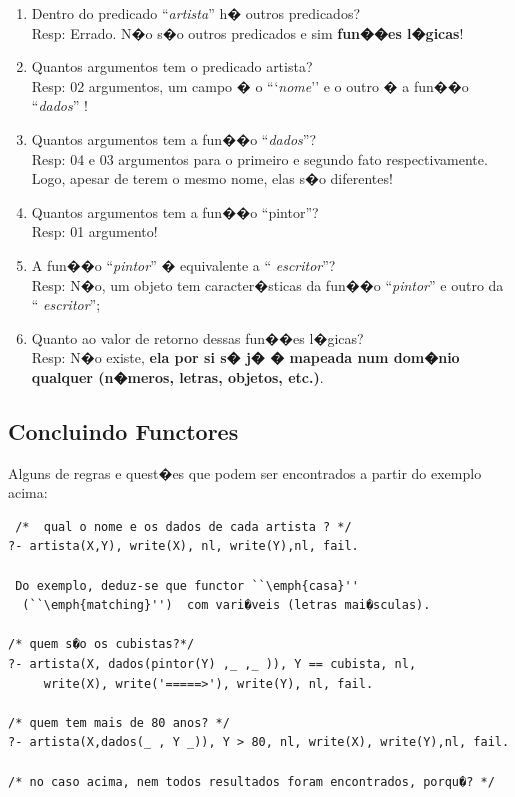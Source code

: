 \documentclass[final,a4paper]{article}
\begin{document}
\begin{enumerate}
\setlength{\itemsep}{-5pt}
 \item Dentro do predicado ``{\em artista}'' h� outros
predicados?\\
Resp:   Errado. N�o s�o outros predicados e sim
{\bf fun��es l�gicas}!

\item Quantos argumentos tem o predicado
artista?\\
Resp:  02 argumentos, um campo � o ```{\em nome}'' e o outro
� a fun��o ``{\em dados}'' !

\item Quantos argumentos tem a  fun��o
``{\em dados}''?\\
Resp:  04 e 03 argumentos para o primeiro e segundo fato respectivamente. Logo,
apesar de terem o mesmo nome, elas s�o diferentes!

\item Quantos argumentos tem a fun��o ``pintor''?\\
Resp:  01 argumento!

\item A fun��o ``{\em pintor}'' � equivalente a ``{\em
escritor}''?\\
Resp: N�o, um objeto tem caracter�sticas da
fun��o ``{\em pintor}'' e outro da ``{\em
escritor}'';

\item  Quanto ao valor de retorno dessas fun��es
l�gicas?\\
Resp: N�o existe, {\bf ela por si s� j� � mapeada num
 dom�nio qualquer (n�meros, letras, objetos, etc.)}.
\end{enumerate}


 \subsection {Concluindo Functores}

 Alguns de regras e quest�es que podem ser
 encontrados a partir do exemplo acima:

{\small
  \begin{verbatim}
 /*  qual o nome e os dados de cada artista ? */
?- artista(X,Y), write(X), nl, write(Y),nl, fail.

 Do exemplo, deduz-se que functor ``\emph{casa}''
  (``\emph{matching}'')  com vari�veis (letras mai�sculas).

/* quem s�o os cubistas?*/
?- artista(X, dados(pintor(Y) ,_ ,_ )), Y == cubista, nl,
     write(X), write('=====>'), write(Y), nl, fail.

/* quem tem mais de 80 anos? */
?- artista(X,dados(_ , Y _)), Y > 80, nl, write(X), write(Y),nl, fail.

/* no caso acima, nem todos resultados foram encontrados, porqu�? */
  \end{verbatim}
}
\end{document}
